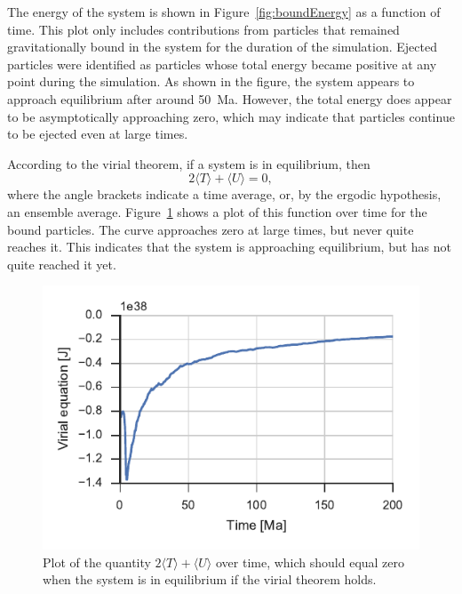 \documentclass[aps,prc,reprint,floatfix,nobalancelastpage]{revtex4-1}
\begin{document}
    The energy of the system is shown in Figure~\ref{fig:boundEnergy} as a function of time. This plot only includes contributions from particles that remained gravitationally bound in the system for the duration of the simulation. Ejected particles were identified as particles whose total energy became positive at any point during the simulation. As shown in the figure, the system appears to approach equilibrium after around \SI{50}{Ma}. However, the total energy does appear to be asymptotically approaching zero, which may indicate that particles continue to be ejected even at large times.

    According to the virial theorem, if a system is in equilibrium, then
    \begin{equation}
        2\langle T \rangle + \langle U \rangle = 0, \label{eq:virial}
    \end{equation}
    where the angle brackets indicate a time average, or, by the ergodic hypothesis, an ensemble average. \cite{Hjorth-Jensen2016} Figure~\ref{fig:virial} shows a plot of this function over time for the bound particles. The curve approaches zero at large times, but never quite reaches it. This indicates that the system is approaching equilibrium, but has not quite reached it yet.

    \begin{figure}[p]
        \centering
        \includegraphics{virial.pdf}
        \caption{Plot of the quantity $2\langle T \rangle + \langle U \rangle$ over time, which should equal zero when the system is in equilibrium if the virial theorem holds.}
        \label{fig:virial}
    \end{figure}
\end{document}
